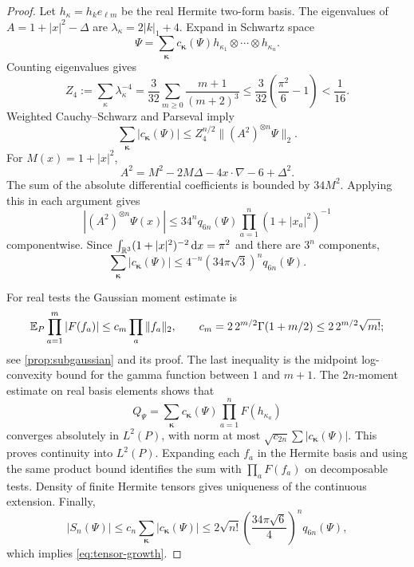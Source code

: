 \begin{proof}
Let \(h_\kappa=h_ke_{\ell m}\) be the real Hermite two-form basis.
The eigenvalues of \(A=1+|x|^2-\Delta\) are
\(\lambda_\kappa=2|k|_1+4\). Expand in Schwartz space
\[
 \Psi=\sum_{\boldsymbol\kappa}c_{\boldsymbol\kappa}(\Psi)
 h_{\kappa_1}\otimes\cdots\otimes h_{\kappa_n}.
\]
Counting eigenvalues gives
\[
 Z_4:=\sum_\kappa\lambda_\kappa^{-4}
 =\frac3{32}\sum_{m\ge0}\frac{m+1}{(m+2)^3}
 \le\frac3{32}\left(\frac{\pi^2}{6}-1\right)<\frac1{16}.
\]
Weighted Cauchy--Schwarz and Parseval imply
\[
 \sum_{\boldsymbol\kappa}|c_{\boldsymbol\kappa}(\Psi)|
 \le Z_4^{n/2}\|(A^2)^{\otimes n}\Psi\|_2.
\]
For \(M(x)=1+|x|^2\),
\[
 A^2=M^2-2M\Delta-4x\cdot\nabla-6+\Delta^2.
\]
The sum of the absolute differential coefficients is bounded by
\(34M^2\). Applying this in each argument gives
\[
 |(A^2)^{\otimes n}\Psi(x)|
 \le34^nq_{6n}(\Psi)\prod_{a=1}^n(1+|x_a|^2)^{-1}
\]
componentwise. Since
\(\int_{\mathbb R^3}(1+|x|^2)^{-2}\,\mathrm d x=\pi^2\) and there are
\(3^n\) components,
\begin{equation}\label{eq:Hermite-l1}
 \sum_{\boldsymbol\kappa}|c_{\boldsymbol\kappa}(\Psi)|
 \le4^{-n}(34\pi\sqrt3)^nq_{6n}(\Psi).
\end{equation}

For real tests the Gaussian moment estimate is
\[
 \mathbb E_P\prod_{a=1}^m|F(f_a)|
 \le c_m\prod_a\|f_a\|_2,\qquad
 c_m=2\,2^{m/2}\Gamma(1+m/2)
 \le2\,2^{m/2}\sqrt{m!};
\]
see \cref{prop:subgaussian} and its proof.
The last inequality is the midpoint log-convexity bound for the
gamma function between \(1\) and \(m+1\).
The \(2n\)-moment estimate on real basis elements shows that
\begin{equation}\label{eq:tensor-random-evaluation}
 Q_\Psi=\sum_{\boldsymbol\kappa}c_{\boldsymbol\kappa}(\Psi)
             \prod_{a=1}^nF(h_{\kappa_a})
\end{equation}
converges absolutely in \(L^2(P)\), with norm at most
\(\sqrt{c_{2n}}\sum|c_{\boldsymbol\kappa}(\Psi)|\).
This proves continuity into \(L^2(P)\).
Expanding each \(f_a\) in the Hermite basis and using the same
product bound identifies the sum with \(\prod_aF(f_a)\) on
decomposable tests. Density of finite Hermite tensors gives
uniqueness of the continuous extension. Finally,
\[
 |S_n(\Psi)|\le c_n\sum_{\boldsymbol\kappa}|c_{\boldsymbol\kappa}(\Psi)|
 \le2\sqrt{n!}\left(\frac{34\pi\sqrt6}{4}\right)^nq_{6n}(\Psi),
\]
which implies \eqref{eq:tensor-growth}.
\end{proof}
